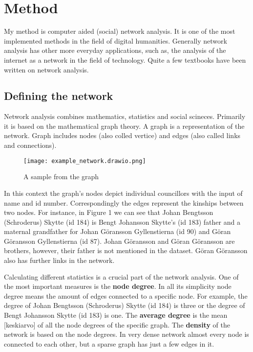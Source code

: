 %

\section{Method}
\label{method}
My method is computer aided (social) network analysis. It is one of the most implemented methods in the field of digital humanities. Generally network analysis has other more everyday applications, such as, the analysis of the internet as a network in the field of technology. Quite a few textbooks have been written on network analysis.


\subsection{Defining the network}
Network analysis combines mathematics, statistics and social scineces. Primarily it is based on the mathematical graph theory. A graph is a representation of the network. Graph includes nodes (also colled vertice) and edges (also called links and connections).

\begin{figure}[h]
	\texttt{[image: example\_network.drawio.png]}
	\centering
	\caption{A sample from the graph} 
	\centering
\end{figure}
In this context the graph's nodes depict individual councillors with the input of name and id number. Correspondingly the edges represent the kinships between two nodes. For instance, in Figure 1 we can see that Johan Bengtsson (Schroderus) Skytte (id 184) is Bengt Johansson Skytte's (id 183) father and a maternal grandfather for Johan Göransson Gyllenstierna (id 90) and Göran Göransson Gyllenstierna (id 87). Johan Göransson and Göran Göransson are brothers, however, their father is not mentioned in the dataset. Göran Göransson also has further links in the network. 

Calculating different statistics is a crucial part of the network analysis. One of the most important measures is the \textbf{node degree}. In all its simplicity node degree means the amount of edges connected to a specific node. For example, the degree of Johan Bengtsson (Schroderus) Skytte (id 184) is three or the degree of Bengt Johansson Skytte (id 183) is one. The \textbf{average degree} is the mean [keskiarvo] of all the node degrees of the specific graph. The \textbf{density} of the network is based on the node degrees. In very dense network almost every node is connected to each other, but a sparse graph has just a few edges in it.

